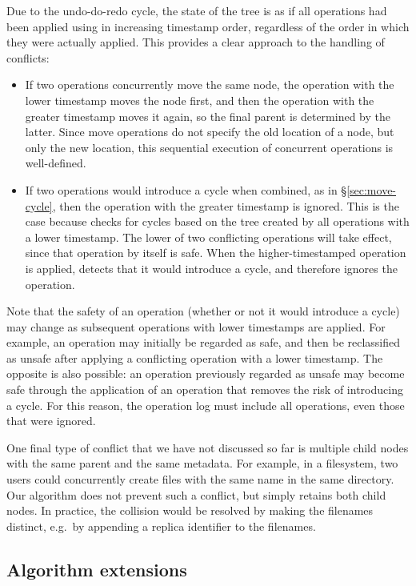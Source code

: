 \documentclass[sigplan,anonymous]{acmart}
\begin{document}
Due to the undo-do-redo cycle, the state of the tree is as if all operations had been applied using  in increasing timestamp order, regardless of the order in which they were actually applied.
This provides a clear approach to the handling of conflicts:
\begin{itemize}
    \item If two operations concurrently move the same node, the operation with the lower timestamp moves the node first, and then the operation with the greater timestamp moves it again, so the final parent is determined by the latter.
        Since move operations do not specify the old location of a node, but only the new location, this sequential execution of concurrent operations is well-defined.
    \item If two operations would introduce a cycle when combined, as in \S\ref{sec:move-cycle}, then the operation with the greater timestamp is ignored.
        This is the case because  checks for cycles based on the tree created by all operations with a lower timestamp.
        The lower of two conflicting operations will take effect, since that operation by itself is safe.
        When the higher-timestamped operation is applied,  detects that it would introduce a cycle, and therefore ignores the operation.
\end{itemize}

Note that the safety of an operation (whether or not it would introduce a cycle) may change as subsequent operations with lower timestamps are applied.
For example, an operation may initially be regarded as safe, and then be reclassified as unsafe after applying a conflicting operation with a lower timestamp.
The opposite is also possible: an operation previously regarded as unsafe may become safe through the application of an operation that removes the risk of introducing a cycle.
For this reason, the operation log must include all operations, even those that were ignored.

One final type of conflict that we have not discussed so far is multiple child nodes with the same parent and the same metadata.
For example, in a filesystem, two users could concurrently create files with the same name in the same directory.
Our algorithm does not prevent such a conflict, but simply retains both child nodes.
In practice, the collision would be resolved by making the filenames distinct, e.g.\ by appending a replica identifier to the filenames.

\subsection{Algorithm extensions}\label{sec:extensions}
\end{document}
